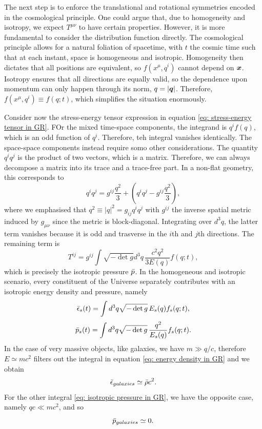 The next step is to enforce the translational and rotational symmetries encoded in the cosmological principle. One could argue that, due to homogeneity and isotropy, we expect $T^{\mu\nu}$ to have certain properties. However, it is more fundamental to consider the distribution function directly. The cosmological principle allows for a natural foliation of spacetime, with $t$ the cosmic time such that at each instant, space is homogeneous and isotropic. Homogeneity then dictates that all positions are equivalent, so $f(x^\mu,q^i)$ cannot depend on $\bm{x}$. Isotropy ensures that all directions are equally valid, so the dependence upon momentum can only happen through its norm, $q = |\bm{q}|$. Therefore, $f(x^\mu,q^i) \equiv f(q;t)$, which simplifies the situation enormously.

Consider now the stress-energy tensor expression in equation \eqref{eq: stress-energy tensor in GR}. FOr the mixed time-space components, the integrand is $q^if(q)$, which is an odd function of $q^i$. Therefore, teh integral vanishes identically. The space-space components instead require somo other considerations. The quantity $q^iq^j$ is the product of two vectors, which is a matrix. Therefore, we can always decompose a matrix into its trace and a trace-free part. In a non-flat geometry, this corresponds to 
\begin{equation}
    q^iq^j = g^{ij}\frac{q^2}{3} + (q^iq^j - g^{ij}\frac{q^2}{3}),
\end{equation}
where we emphasised that $q^2 \equiv |q|^2 = g_{ij}q^iq^j$ with $g^{ij}$ the inverse spatial metric induced by $g_{\mu\nu}$ since the metric is block-diagonal. Integrating over $d^3q$, the latter term vanishes because it is odd and trasverse in the $i$th and $j$th directions. The remaining term is 
\begin{equation}
    T^{ij} = g^{ij}\int \sqrt{-\det{g}}d^3q\,\frac{c^2q^2}{3E(q)}f(q;t),
\end{equation}
which is precisely the isotropic pressure $\bar{p}$. In the homogeneous and isotropic scenario, every constituent of the Universe separately contributes with an isotropic energy density and pressure, namely
\begin{equation}
\label{eq: energy density in GR}
    \bar{\epsilon}_s(t) = \int d^3q\sqrt{-\det{g}}\,E_s(q)f_s(q;t),
\end{equation}
\begin{equation}
\label{eq: isotropic pressure in GR}
    \bar{p}_s(t) = \int d^3q\sqrt{-\det{g}}\,\frac{q^2}{E_s(q)}f_s(q;t).
\end{equation}
In the case of very massive objects, like galaxies, we have $m \gg q/c$, therefore $E \simeq mc^2$ filters out the integral in equation \eqref{eq: energy density in GR} and we obtain 
\begin{eqnarray}
    \bar{\epsilon}_{galaxies} \simeq \bar{\rho}c^2.
\end{eqnarray}
For the other integral \eqref{eq: isotropic pressure in GR}, we have the opposite case, namely $qc \ll mc^2$, and so
\begin{equation}
    \bar{p}_{galaxies} \simeq 0.
\end{equation}

